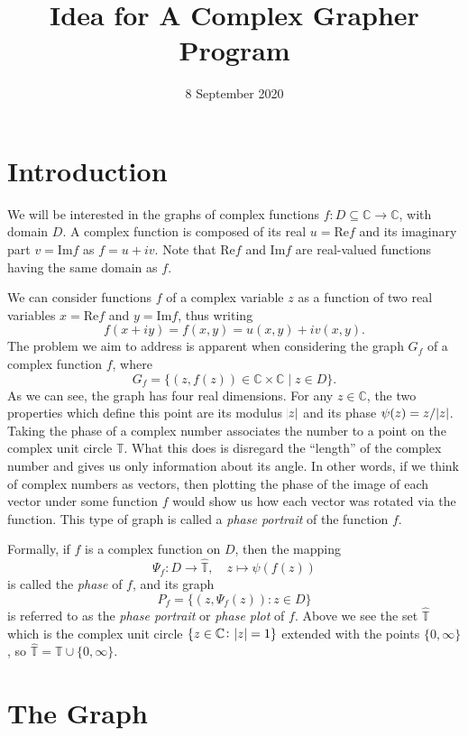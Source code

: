 \documentclass{article}
\theoremstyle{definition}
\theoremstyle{remark}
\theoremstyle{definition}
\begin{document}
\title{Idea for A Complex Grapher Program}

\date{8 September 2020}
\maketitle

\section{Introduction}
    We will be interested in the graphs of complex functions $f\colon D\subseteq\mathbb{C}\rightarrow\mathbb{C}$, with domain $D$. A complex function is composed of its real $u=$Re$f$ and its imaginary part $v=$Im$f$ as $f=u+iv$. Note that Re$f$ and Im$f$ are real-valued functions having the same domain as $f$.\par We can consider functions $f$ of a complex variable $z$ as a function of two real variables $x=$Re$f$ and $y=$Im$f$, thus writing
        \begin{equation*}
            f(x+iy)=f(x,y)=u(x,y)+iv(x,y).
        \end{equation*}
    The problem we aim to address is apparent when considering the graph $G_f$ of a complex function $f$, where
        \begin{equation*}
            G_f=\{(z,f(z))\in\mathbb{C}\times\mathbb{C}\mid z\in D\}.
        \end{equation*}
    As we can see, the graph has four real dimensions. For any $z\in\mathbb{C}$, the two properties which define this point are its modulus $\abs{z}$ and its phase $\psi(z)=z/\abs{z}$. Taking the phase of a complex number associates the number to a point on the complex unit circle $\mathbb{T}$. What this does is disregard the ``length'' of the complex number and gives us only information about its angle. In other words, if we think of complex numbers as vectors, then plotting the phase of the image of each vector under some function $f$ would show us how each vector was rotated via the function. This type of graph is called a \textit{phase portrait} of the function $f$.\par Formally, if $f$ is a complex function on $D$, then the mapping
        \begin{equation*}
            \Psi_f\colon D\rightarrow\hat{\mathbb{T}}, \quad z\mapsto\psi(f(z))
        \end{equation*}
    is called the \textit{phase} of $f$, and its graph
        \begin{equation*}
            P_f=\{(z,\Psi_f(z))\colon z\in D\}
        \end{equation*}
    is referred to as the \textit{phase portrait} or \textit{phase plot} of $f$. Above we see the set $\hat{\mathbb{T}}$ which is the complex unit circle $\{z\in\mathbb{C}\colon\abs{z}=1\}$ extended with the points $\{0,\infty\}$, so $\hat{\mathbb{T}}=\mathbb{T}\cup\{0,\infty\}$.\newpage
    \section{The Graph}
        
\end{document}

